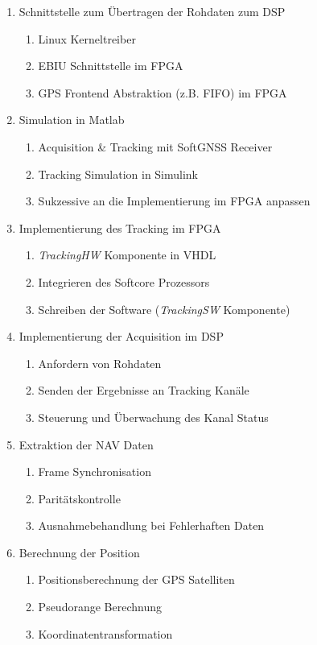\begin{enumerate}
\item Schnittstelle zum Übertragen der Rohdaten zum DSP
    \begin{enumerate}
    \item Linux Kerneltreiber
    \item EBIU Schnittstelle im FPGA
    \item GPS Frontend Abstraktion (z.B. FIFO) im FPGA
    \end{enumerate}
\item Simulation in Matlab
    \begin{enumerate}
    \item Acquisition \& Tracking mit SoftGNSS Receiver
    \item Tracking Simulation in Simulink
    \item Sukzessive an die Implementierung im FPGA anpassen
    \end{enumerate}
\item Implementierung des Tracking im FPGA
    \begin{enumerate}
    \item \emph{TrackingHW} Komponente in VHDL
    \item Integrieren des Softcore Prozessors
    \item Schreiben der Software (\emph{TrackingSW} Komponente)
    \end{enumerate}
\item Implementierung der Acquisition im DSP
\begin{enumerate}
    \item Anfordern von Rohdaten
    \item Senden der Ergebnisse an Tracking Kanäle
    \item Steuerung und Überwachung des Kanal Status
\end{enumerate}
\item Extraktion der NAV Daten
\begin{enumerate}
    \item Frame Synchronisation
    \item Paritätskontrolle
    \item Ausnahmebehandlung bei Fehlerhaften Daten
\end{enumerate}
\item Berechnung der Position
    \begin{enumerate}
    \item Positionsberechnung der GPS Satelliten
    \item Pseudorange Berechnung
    \item Koordinatentransformation
    \end{enumerate}
\end{enumerate}

